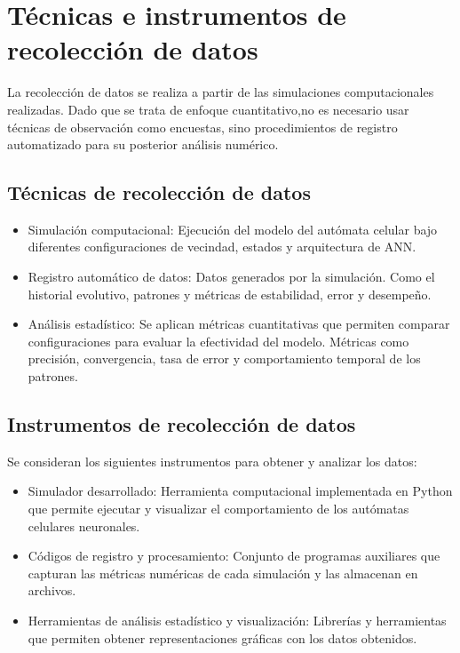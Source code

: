 \section{Técnicas e instrumentos de recolección de datos}

La recolección de datos se realiza a partir de las simulaciones computacionales realizadas. Dado que se trata de enfoque cuantitativo,no es necesario usar técnicas de observación como encuestas, sino procedimientos de registro automatizado para su posterior análisis numérico. 

\subsection{Técnicas de recolección de datos}

\begin{itemize}
	\item Simulación computacional: Ejecución del modelo del autómata celular bajo diferentes configuraciones de vecindad, estados y arquitectura de ANN.
	
	\item Registro automático de datos: Datos generados por la simulación. Como el historial evolutivo, patrones y métricas de estabilidad, error y desempeño.
	
	\item Análisis estadístico: Se aplican métricas cuantitativas que permiten comparar configuraciones para evaluar la efectividad del modelo. Métricas como precisión, convergencia, tasa de error y comportamiento temporal de los patrones.
\end{itemize}

\subsection{Instrumentos de recolección de datos}

Se consideran los siguientes instrumentos para obtener y analizar los datos:
\begin{itemize}
	\item Simulador desarrollado: Herramienta computacional implementada en Python que permite ejecutar y visualizar el comportamiento de los autómatas celulares neuronales.
	
	\item Códigos de registro y procesamiento: Conjunto de programas auxiliares que capturan las métricas numéricas de cada simulación y las almacenan en archivos.
	
	\item Herramientas de análisis estadístico y visualización: Librerías y herramientas que permiten obtener representaciones gráficas con los datos obtenidos. 
\end{itemize}